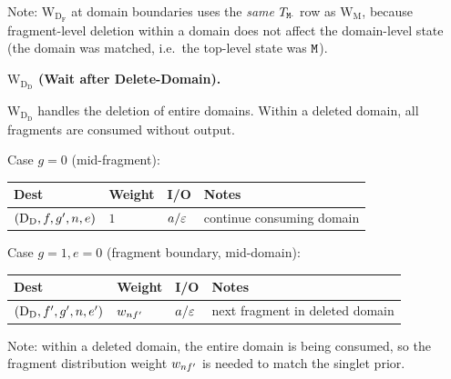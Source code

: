 Note: $\mathrm{W_{D_F}}$ at domain boundaries uses the \emph{same} $T_{{\tt M}\cdot}$
row as $\mathrm{W_M}$, because fragment-level deletion within a domain does not affect
the domain-level state (the domain was matched, i.e.\ the top-level state was ${\tt M}$).

\bigskip
\noindent\textbf{$\mathrm{W_{D_D}}$ (Wait after Delete-Domain).}

$\mathrm{W_{D_D}}$ handles the deletion of entire domains.
Within a deleted domain, all fragments are consumed without output.

\medskip
\noindent Case $g=0$ (mid-fragment):
\begin{center}
\renewcommand{\arraystretch}{1.3}
\begin{tabular}{llll}
\hline
Dest & Weight & I/O & Notes \\
\hline
$(\mathrm{D_D}, f, g', n, e)$ &
  $1$ &
  $a / \varepsilon$ &
  continue consuming domain \\
\hline
\end{tabular}
\end{center}

\noindent Case $g=1, e=0$ (fragment boundary, mid-domain):
\begin{center}
\renewcommand{\arraystretch}{1.3}
\begin{tabular}{llll}
\hline
Dest & Weight & I/O & Notes \\
\hline
$(\mathrm{D_D}, f', g', n, e')$ &
  $w_{nf'}$ &
  $a / \varepsilon$ &
  next fragment in deleted domain \\
\hline
\end{tabular}
\end{center}

Note: within a deleted domain, the entire domain is being consumed,
so the fragment distribution weight $w_{nf'}$ is needed to
match the singlet prior.

